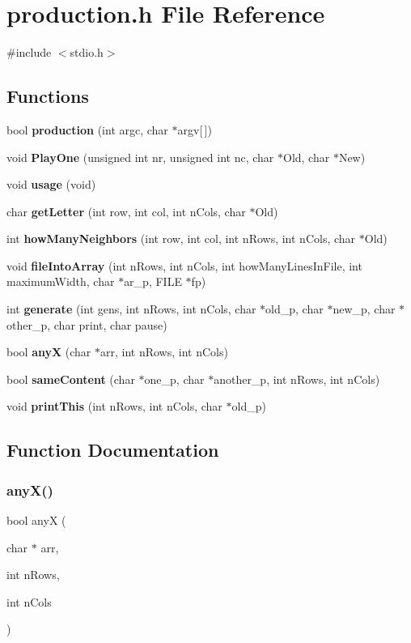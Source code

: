\section{production.\+h File Reference}
\label{production_8h}
{\ttfamily \#include $<$stdio.\+h$>$}\newline
\subsection*{Functions}
\begin{DoxyCompactItemize}
\item 
bool \textbf{ production} (int argc, char $\ast$argv[$\,$])
\item 
void \textbf{ Play\+One} (unsigned int nr, unsigned int nc, char $\ast$Old, char $\ast$New)
\item 
void \textbf{ usage} (void)
\item 
char \textbf{ get\+Letter} (int row, int col, int n\+Cols, char $\ast$Old)
\item 
int \textbf{ how\+Many\+Neighbors} (int row, int col, int n\+Rows, int n\+Cols, char $\ast$Old)
\item 
void \textbf{ file\+Into\+Array} (int n\+Rows, int n\+Cols, int how\+Many\+Lines\+In\+File, int maximum\+Width, char $\ast$ar\+\_\+p, F\+I\+LE $\ast$fp)
\item 
int \textbf{ generate} (int gens, int n\+Rows, int n\+Cols, char $\ast$old\+\_\+p, char $\ast$new\+\_\+p, char $\ast$other\+\_\+p, char print, char pause)
\item 
bool \textbf{ anyX} (char $\ast$arr, int n\+Rows, int n\+Cols)
\item 
bool \textbf{ same\+Content} (char $\ast$one\+\_\+p, char $\ast$another\+\_\+p, int n\+Rows, int n\+Cols)
\item 
void \textbf{ print\+This} (int n\+Rows, int n\+Cols, char $\ast$old\+\_\+p)
\end{DoxyCompactItemize}


\subsection{Function Documentation}
\mbox{\label{production_8h_a85f4ceb7eddb00ab9989daf800a74d3f}} 
\subsubsection{any\+X()}
{\footnotesize\ttfamily bool anyX (\begin{DoxyParamCaption}\item[{char $\ast$}]{arr,  }\item[{int}]{n\+Rows,  }\item[{int}]{n\+Cols }\end{DoxyParamCaption})}

